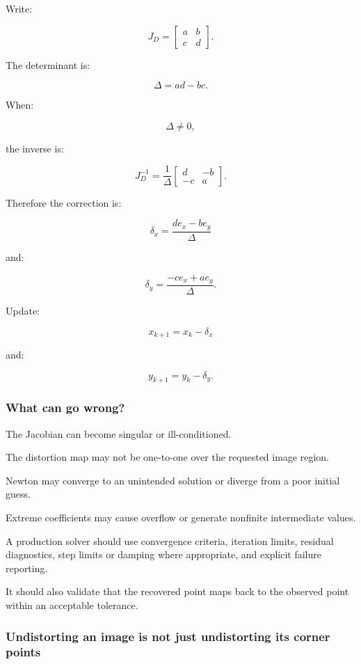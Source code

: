 Write:

\[
 J_D= \begin{bmatrix} a&b\\c&d \end{bmatrix}.
\]

The determinant is:

\[
 \boxed{ \Delta=ad-bc }.
\]

When:

\[
 \Delta\ne0,
\]

the inverse is:

\[
 J_D^{-1} = \frac1\Delta \begin{bmatrix} d&-b\\ -c&a \end{bmatrix}.
\]

Therefore the correction is:

\[
 \boxed{ \delta_x= \frac{de_x-be_y}{\Delta} }
\]

and:

\[
 \boxed{ \delta_y= \frac{-ce_x+ae_y}{\Delta} }.
\]

Update:

\[
 \boxed{ x_{k+1}=x_k-\delta_x }
\]

and:

\[
 \boxed{ y_{k+1}=y_k-\delta_y }.
\]

\subsubsection{What can go wrong?}\label{what-can-go-wrong}

The Jacobian can become singular or ill-conditioned.

The distortion map may not be one-to-one over the requested image region.

Newton may converge to an unintended solution or diverge from a poor initial guess.

Extreme coefficients may cause overflow or generate nonfinite intermediate values.

A production solver should use convergence criteria, iteration limits, residual diagnostics, step limits or damping where appropriate, and explicit failure reporting.

It should also validate that the recovered point maps back to the observed point within an acceptable tolerance.

\subsubsection{Undistorting an image is not just undistorting its corner points}\label{undistorting-an-image-is-not-just-undistorting-its-corner-points}

